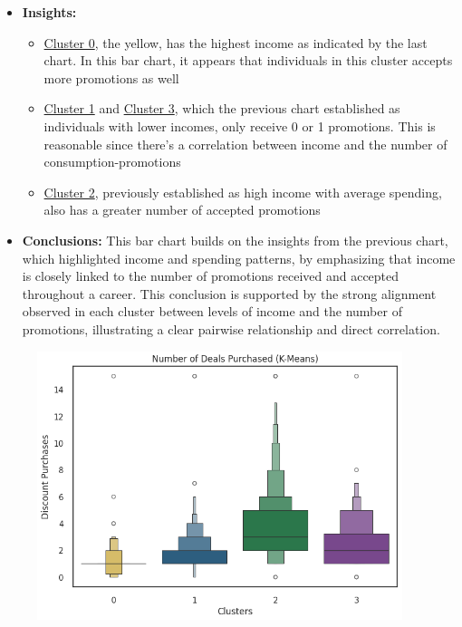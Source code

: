 \documentclass[11pt]{article}
\begin{document}
\vspace{1\baselineskip}
\begin{itemize}
	\item \textbf{Insights:}

\begin{itemize}
	\item \uline{\textcolor[HTML]{BF9000}{Cluster 0}}, the yellow, has the highest income as indicated by the last chart. In this bar chart, it appears that individuals in this cluster accepts more promotions as well

	\item \uline{\textcolor[HTML]{0B5394}{Cluster 1}} and \uline{\textcolor[HTML]{674EA7}{Cluster 3}}, which the previous chart established as individuals with lower incomes, only receive 0 or 1 promotions. This is reasonable since there's a correlation between income and the number of consumption-promotions

	\item \uline{\textcolor[HTML]{38761D}{Cluster 2}}, previously established as high income with average spending, also has a greater number of accepted promotions

\end{itemize}
\end{itemize}
\vspace{1\baselineskip}
\begin{itemize}
	\item \textbf{Conclusions:} This bar chart builds on the insights from the previous chart, which highlighted income and spending patterns, by emphasizing that income is closely linked to the number of promotions received and accepted throughout a career. This conclusion is supported by the strong alignment observed in each cluster between levels of income and the number of promotions, illustrating a clear pairwise relationship and direct correlation.

\end{itemize}
\vspace{2\baselineskip}
\begin{figure}[H]
\centering
\includegraphics[width=10.67cm,height=7.85cm]{./images/image15.png}
\end{figure}
\end{document}
